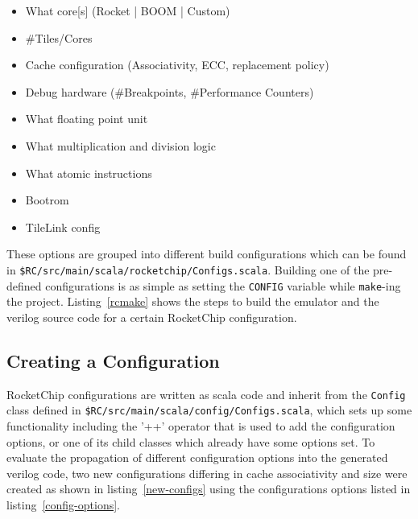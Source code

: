 \documentclass[journal,a4paper]{IEEEtran}
\begin{document}
\begin{itemize}
	\item What core[s] (Rocket | BOOM | Custom)
	\item \#Tiles/Cores
	\item Cache configuration (Associativity, ECC, replacement policy)
	\item Debug hardware (\#Breakpoints, \#Performance Counters)
	\item What floating point unit
	\item What multiplication and division logic
	\item What atomic instructions
	\item Bootrom
	\item TileLink config
\end{itemize}
These options are grouped into different build configurations which can be found in \texttt{\$RC/src/main/scala/rocketchip/Configs.scala}.
Building one of the pre-defined configurations is as simple as setting the \texttt{CONFIG} variable while \texttt{make}-ing the project. Listing~\ref{rcmake} shows the steps to build the emulator and the verilog source code for a certain RocketChip configuration.


\subsection{Creating a Configuration}
RocketChip configurations are written as scala code and inherit from the \texttt{Config} class defined in \texttt{\$RC/src/main/scala/config/Configs.scala}, which sets up some functionality including the '++' operator that is used to add the configuration options, or one of its child classes which already have some options set.
To evaluate the propagation of different configuration options into the generated verilog code, two new configurations differing in cache associativity and size were created as shown in listing~\ref{new-configs} using the configurations options listed in listing~\ref{config-options}.

\end{document}
